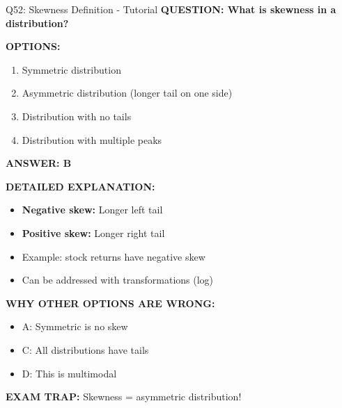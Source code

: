 \documentclass[8pt]{beamer}
\begin{document}
	\begin{frame}{Q52: Skewness Definition - Tutorial}
		\fontsize{6.5}{7.5}\selectfont
		\textbf{QUESTION: What is skewness in a distribution?}
		
		\vspace{0.1cm}
		\textbf{OPTIONS:}
		\begin{enumerate}
			\item Symmetric distribution
			\item Asymmetric distribution (longer tail on one side)
			\item Distribution with no tails
			\item Distribution with multiple peaks
		\end{enumerate}
		
		\vspace{0.1cm}
		\textcolor{myblue}{\textbf{ANSWER: B}}
		
		\vspace{0.1cm}
		\textbf{DETAILED EXPLANATION:}
		\begin{itemize}
			\item \textbf{Negative skew:} Longer left tail
			\item \textbf{Positive skew:} Longer right tail
			\item Example: stock returns have negative skew
			\item Can be addressed with transformations (log)
		\end{itemize}
		
		\vspace{0.1cm}
		\textcolor{myred}{\textbf{WHY OTHER OPTIONS ARE WRONG:}}
		\begin{itemize}
			\item \textcolor{myred}{A:} Symmetric is no skew
			\item \textcolor{myred}{C:} All distributions have tails
			\item \textcolor{myred}{D:} This is multimodal
		\end{itemize}
		
		\textcolor{myred}{\textbf{EXAM TRAP:}} Skewness = \textcolor{myblue}{asymmetric distribution}!
	\end{frame}
	
\end{document}
